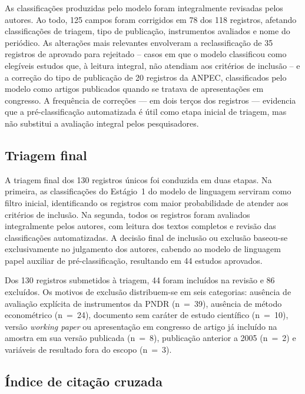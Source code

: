 As classificações produzidas pelo modelo foram integralmente revisadas pelos autores. Ao todo, 125 campos foram corrigidos em 78 dos 118 registros, afetando classificações de triagem, tipo de publicação, instrumentos avaliados e nome do periódico. As alterações mais relevantes envolveram a reclassificação de 35 registros de aprovado para rejeitado -- casos em que o modelo classificou como elegíveis estudos que, à leitura integral, não atendiam aos critérios de inclusão -- e a correção do tipo de publicação de 20 registros da ANPEC, classificados pelo modelo como artigos publicados quando se tratava de apresentações em congresso. A frequência de correções --- em dois terços dos registros --- evidencia que a pré-classificação automatizada é útil como etapa inicial de triagem, mas não substitui a avaliação integral pelos pesquisadores.

\subsection{Triagem final}
\label{subsec:metodo-triagem-final}

A triagem final dos 130 registros únicos foi conduzida em duas etapas. Na primeira, as classificações do Estágio~1 do modelo de linguagem serviram como filtro inicial, identificando os registros com maior probabilidade de atender aos critérios de inclusão. Na segunda, todos os registros foram avaliados integralmente pelos autores, com leitura dos textos completos e revisão das classificações automatizadas. A decisão final de inclusão ou exclusão baseou-se exclusivamente no julgamento dos autores, cabendo ao modelo de linguagem papel auxiliar de pré-classificação, resultando em 44 estudos aprovados.

Dos 130 registros submetidos à triagem, 44 foram incluídos na revisão e 86 excluídos. Os motivos de exclusão distribuem-se em seis categorias: ausência de avaliação explícita de instrumentos da PNDR (n~=~39), ausência de método econométrico (n~=~24), documento sem caráter de estudo científico (n~=~10), versão \textit{working paper} ou apresentação em congresso de artigo já incluído na amostra em sua versão publicada (n~=~8), publicação anterior a 2005 (n~=~2) e variáveis de resultado fora do escopo (n~=~3).

\subsection{Índice de citação cruzada}
\label{subsec:metodo-indice-citacao}

